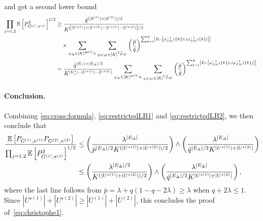 \documentclass[final]{colt2026}
\newcommand{\1}{\mathbf{1}}
\newcommand{\ch}[1]{\textcolor{green}{#1}}
\newcommand{\bbE}{\mathbb{E}}
\newcommand{\pa}[1]{\left(#1\right)}
\newcommand{\ac}[1]{\left\{#1\right\}}
\newcommand{\cro}[1]{\left[#1\right]}
\begin{document}
and get a second lower bound
\begin{align}
\prod_{j=1,2}\bbE\cro{P_{G^{(j)}, \pi^{(j)}}^2}^{1/2} & \geq {\bar q^{(|E^{(1)}|+|E^{(2)}|)/2}\over K^{\pa{|V^{\star(1)}|+|V^{\star(2)}|-|U^{\star(1)}|-|U^{\star(2)}|}/2}} \nonumber\\
&\quad \times \sum_{\varphi_{\Delta}\in [K]^{\#\mathrm{CC}_{\Delta}}} \sum_{\varphi_{PM}\in [K]^{V^{\star}_{PM}}}  \pa{\bar p\over \bar q}^{\sum_{k=1}^K\left|E_{\cap}\cro{\varphi_{SM}^{-1}(\ac{k})\cup\varphi_{PM}^{-1}(\ac{k})}\right|}\nonumber \\
& = {\bar q^{|E_{\cap}|+|E_{\Delta}|/2} \over K^{|V^{\star}_{\cup}|-|U^{\star(1)}|-|U^{\star(2)}|}} \sum_{\varphi_{\Delta}\in [K]^{\#\mathrm{CC}_{\Delta}}} \sum_{\varphi_{PM}\in [K]^{V^{\star}_{PM}}}  \pa{\bar p\over \bar q}^{\sum_{k=1}^K\left|E_{\cap}\cro{\varphi_{SM}^{-1}(\ac{k})\cup\varphi_{PM}^{-1}(\ac{k})}\right|}. \label{eq:restrictedLB2}
\end{align}




\paragraph{Conclusion.}
Combining \eqref{eq:cross:formula}, \eqref{eq:restrictedLB1} and \eqref{eq:restrictedLB2}, we then conclude that
\begin{align*}
{ \bbE\cro{P_{G^{(1)}, \pi^{(1)}}P_{G^{(2)}, \pi^{(2)}}} \over \prod_{j=1,2}\bbE\cro{P_{G^{(j)}, \pi^{(j)}}^2}^{1/2}} 
& \leq \pa{\lambda^{|E_{\Delta}|}\over \bar p^{|E_{\Delta}|/2} K^{(|U^{\star(1)}|+|U^{\star(2)}|)/2}} \wedge \pa{\lambda^{|E_{\Delta}|}\over \bar q^{|E_{\Delta}|/2} K^{|U^{\star(1)}|+|U^{\star(2)}|}}\\
&\leq \pa{\lambda^{|E_{\Delta}|/2}\over K^{(|U^{\star(1)}|+|U^{\star(2)}|)/2}} \wedge \pa{\lambda^{|E_{\Delta}|}\over \bar q^{|E_{\Delta}|/2} K^{|U^{\star(1)}|+|U^{\star(2)}|}},
\end{align*}
where the last line follows from $\bar p= \lambda+q (1-q-2\lambda)\geq \lambda$ when $q+2\lambda \leq 1$. Since $|U^{\star(1)}|+|U^{\star(2)}|\geq |U^{(1)}|+|U^{(2)}|$, this concludes the proof of~\eqref{eq:christophe1}. 

\end{document}

